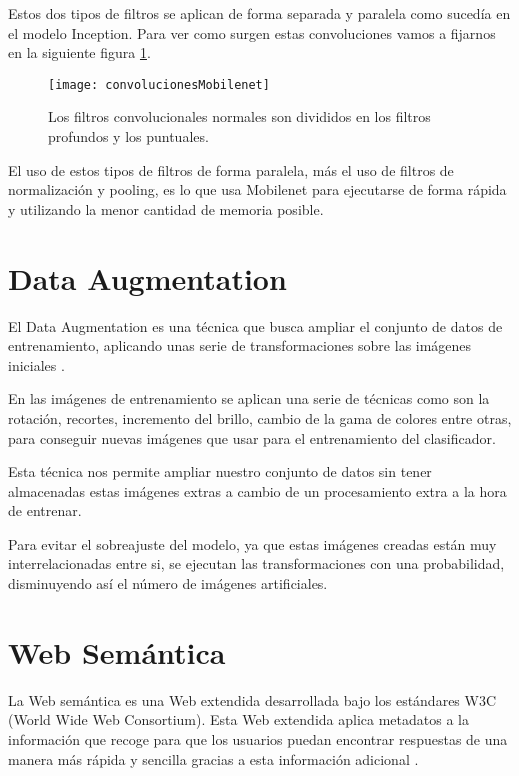 Estos dos tipos de filtros se aplican de forma separada y paralela como sucedía en el modelo Inception. Para ver como surgen estas convoluciones vamos a fijarnos en la siguiente figura \ref{figconvolucionesMobilenet}.

\begin{figure}[h]
    \begin{center}%
        \begin{center}%
          \texttt{[image: convolucionesMobilenet]}%
          \caption[División filtros convolucionales]{Los filtros convolucionales normales son divididos en los filtros profundos y los puntuales.}%
          \label{figconvolucionesMobilenet}%
        \end{center}%
  	\end{center}%
\end{figure}%

El uso de estos tipos de filtros de forma paralela, más el uso de filtros de normalización y pooling, es lo que usa Mobilenet para ejecutarse de forma rápida y utilizando la menor cantidad de memoria posible.

\section{Data Augmentation}

	El Data Augmentation es una técnica que busca ampliar el conjunto de datos de entrenamiento, aplicando unas serie de transformaciones sobre las imágenes iniciales \cite{NIPS2012_4824}.
	
En las imágenes de entrenamiento se aplican una serie de técnicas como son la rotación, recortes, incremento del brillo, cambio de la gama de colores  entre otras, para conseguir nuevas imágenes que usar para el entrenamiento del clasificador.

Esta técnica nos permite ampliar nuestro conjunto de datos sin tener almacenadas estas imágenes extras a cambio de un procesamiento extra a la hora de entrenar.

Para evitar el sobreajuste del modelo, ya que estas imágenes creadas están muy interrelacionadas entre si, se ejecutan las transformaciones con una probabilidad, disminuyendo así el número de imágenes artificiales.


\section{Web Semántica}

La Web semántica es una Web extendida desarrollada bajo los estándares W3C (World Wide Web Consortium). Esta Web extendida aplica metadatos a la información que recoge para que los usuarios puedan encontrar respuestas de una manera más rápida y sencilla gracias a esta información adicional \cite{webSemantica}.

